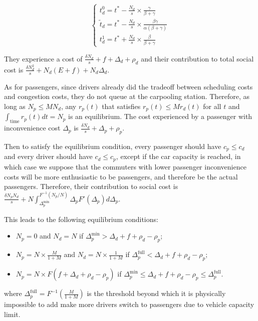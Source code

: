 \documentclass[english, a4paper]{article}
\theoremstyle{plain}
\theoremstyle{definition}
\theoremstyle{remark}
\begin{document}
\begin{equation}
\left\{
\begin{array}{l}
    t_d^0 = t^* - \frac{N_d}{s} \times \frac{\gamma}{\beta + \gamma}\\
    \tilde{t}_d = t^* - \frac{N_d}{s} \times \frac{\beta \gamma}{\alpha(\beta + \gamma)}\\
    t_d^1 = t^* + \frac{N_d}{s} \times \frac{\beta}{\beta + \gamma}
\end{array}
\right.
\end{equation}

They experience a cost of $\frac{\delta N_d}{s} + f + \Delta _d + \rho _d$ and their contribution to total social cost is $\frac{\delta N_d^2}{s} + N_d(E + f) + N_d \Delta _d$.

As for passengers, since drivers already did the tradeoff between scheduling costs and congestion costs, they do not queue at the carpooling station. Therefore, as long as $N_p \leq M N_d$, any $r_p(t)$ that satisfies $r_p(t) \leq M r_d(t)$ for all $t$ and $\int_{\text{time}} r_p(t) dt = N_p$ is an equilibrium. The cost experienced by a passenger with inconvenience cost $\Delta _p$ is $\frac{\delta N_d}{s} + \Delta _p + \rho _p$.

Then to satisfy the equilibrium condition, every passenger should have $c_p \leq c_d$ and every driver should have $c_d \leq c_p$, except if the car capacity is reached, in which case we suppose that the commuters with lower passenger inconvenience costs will be more enthusiastic to be passengers, and therefore be the actual passengers. Therefore, their contribution to social cost is $\frac{\delta N_p N_d}{s} +  N\int_{\Delta _p^{\text{min}}}^{F^{-1}(N_p / N)} \Delta _p F'(\Delta _p) d \Delta _p$.


This leads to the following equilibrium conditions:
\begin{itemize}
    \item $N_p = 0$ and $N_d = N$ if $\Delta _p^{\text{min}} > \Delta _d + f + \rho _d - \rho _p$;
    \item $N_p = N\times \frac{M}{1+M}$ and $N_d = N\times \frac{1}{1+M}$ if $\Delta _p^{\text{full}} < \Delta _d + f + \rho _d - \rho _p$;
    \item $N_p = N\times F(f + \Delta _d + \rho _d - \rho _p)$ if $\Delta _p^{\text{min}} \leq \Delta _d + f + \rho _d - \rho _p \leq \Delta _p^{\text{full}}$.
\end{itemize}
where $\Delta _p^{\text{full}} = F^{-1}\left( \frac{M}{1+M} \right)$ is the threshold beyond which it is physically impossible to add make more drivers switch to passengers due to vehicle capacity limit.
\end{document}
